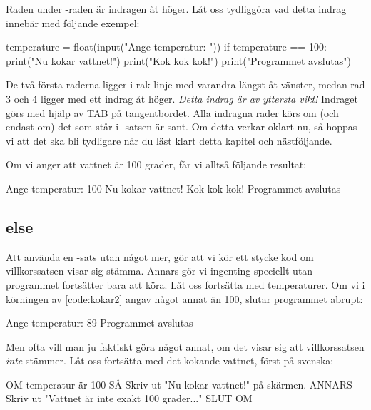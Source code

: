 Raden under -raden är indragen åt höger. Låt oss tydliggöra vad detta indrag innebär med följande exempel:

\begin{python}[caption={Vår andra if-sats},label={code:kokar2}]
temperature = float(input("Ange temperatur: "))
if temperature == 100:
	print("Nu kokar vattnet!")
	print("Kok kok kok!")
print("Programmet avslutas")
\end{python}

De två första raderna ligger i rak linje med varandra längst åt vänster, medan rad 3 och 4 ligger med ett indrag åt höger. \emph{Detta indrag är av yttersta vikt!} Indraget görs med hjälp av TAB på tangentbordet. Alla indragna rader körs om (och endast om) det som står i -satsen är sant. Om detta verkar oklart nu, så hoppas vi att det ska bli tydligare när du läst klart detta kapitel och nästföljande.

Om vi anger att vattnet är 100 grader, får vi alltså följande resultat:

\vspace{10pt}
\begin{python}
Ange temperatur: 100
Nu kokar vattnet!
Kok kok kok!
Programmet avslutas
\end{python}
\newpage
\subsection{else}
Att använda en -sats utan något mer, gör att vi kör ett stycke kod om villkorssatsen visar sig stämma. Annars gör vi ingenting speciellt utan programmet fortsätter bara att köra. Låt oss fortsätta med temperaturer. Om vi i körningen av \autoref{code:kokar2} angav något annat än 100, slutar programmet abrupt:

\vspace{10pt}
\begin{python}
Ange temperatur: 89
Programmet avslutas
\end{python}

Men ofta vill man ju faktiskt göra något annat, om det visar sig att villkorssatsen \emph{inte} stämmer. Låt oss fortsätta med det kokande vattnet, först på svenska:

\begin{pseudo}
OM temperatur är 100 SÅ
   Skriv ut "Nu kokar vattnet!" på skärmen.
ANNARS
   Skriv ut "Vattnet är inte exakt 100 grader..."
SLUT OM
\end{pseudo}

